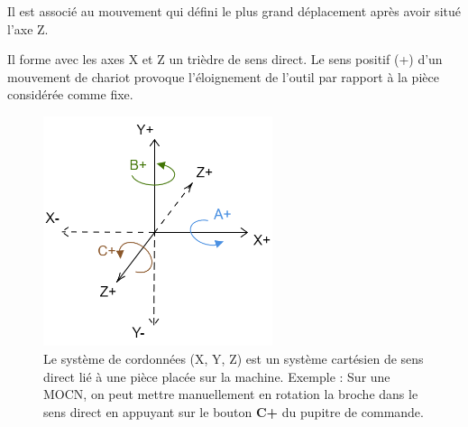 \documentclass[
	11pt, %
	fleqn, %
	a4paper, %
]{LegrandOrangeBook}
\begin{document}
\begin{definition}
    Il est associé au mouvement qui défini le plus grand déplacement après avoir situé l’axe Z. 
\end{definition}

\begin{definition}
    Il forme avec les axes X et Z un trièdre de sens direct. Le sens positif (+) d’un mouvement de chariot provoque l’éloignement de l’outil par rapport à la pièce considérée comme fixe. 
\end{definition}


\begin{figure}[H] %
	\centering %
	\includegraphics[width=0.6\textwidth]{Images/axe1.png} %
	\caption{Le système de cordonnées (X, Y, Z) est un système cartésien de sens direct lié à une pièce placée sur la machine. Exemple : Sur une MOCN, on peut mettre manuellement en rotation la broche dans le sens direct en appuyant sur le bouton \textbf{C+} du pupitre de commande.}
	\label{Axes_1} %
\end{figure}
\end{document}
